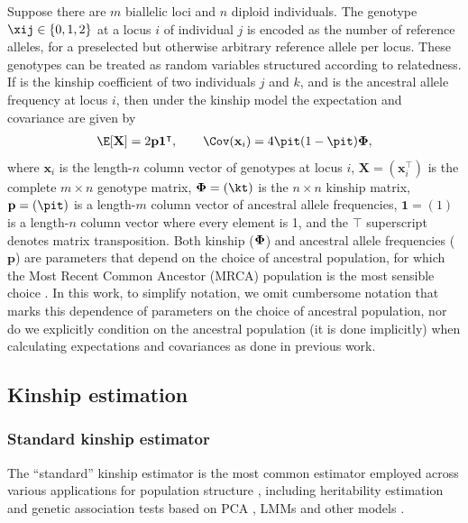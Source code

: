\documentclass[11pt]{article}
\newcommand{\kinMat}{%
  \ensuremath{%
    \mathbf{\Phi}
  }%
  \xspace%
}%
\begin{document}
Suppose there are $m$ biallelic loci and $n$ diploid individuals.
The genotype $\xij \in \{0,1,2\}$ at a locus $i$ of individual $j$ is encoded as the number of reference alleles, for a preselected but otherwise arbitrary reference allele per locus.
These genotypes can be treated as random variables structured according to relatedness.
If \kt is the kinship coefficient of two individuals $j$ and $k$, and \pit is the ancestral allele frequency at locus $i$, then under the kinship model \citep{ochoa_fst1,ochoa_estimating_2021} the expectation and covariance are given by
\begin{align*}
  \E[\mathbf{X}]
  =
    2 \mathbf{p} \mathbf{1}^\intercal
  ,
  \quad\quad
  \Cov(\mathbf{x}_i)
  =
    4 \pit (1-\pit) \kinMat
    ,
\end{align*}
where $\mathbf{x}_i$ is the length-$n$ column vector of genotypes at locus $i$, $\mathbf{X} = (\mathbf{x}_i^\intercal)$ is the complete $m \times n$ genotype matrix, $\kinMat = (\kt)$ is the $n \times n$ kinship matrix, $\mathbf{p} = (\pit)$ is a length-$m$ column vector of ancestral allele frequencies, $\mathbf{1} = (1)$ is a length-$n$ column vector where every element is 1, and the $\intercal$ superscript denotes matrix transposition.
Both kinship ($\kinMat$) and ancestral allele frequencies ($\mathbf{p}$) are parameters that depend on the choice of ancestral population, for which the Most Recent Common Ancestor (MRCA) population is the most sensible choice \citep{ochoa_fst1,ochoa_estimating_2021}.
In this work, to simplify notation, we omit cumbersome notation that marks this dependence of parameters on the choice of ancestral population, nor do we explicitly condition on the ancestral population (it is done implicitly) when calculating expectations and covariances as done in previous work.

\subsection{Kinship estimation}

\subsubsection{Standard kinship estimator}

The ``standard'' kinship estimator is the most common estimator employed across various applications for population structure \citep{astle_population_2009, yang_advantages_2014, speed_relatedness_2015, wang_efficient_2017}, including
heritability estimation \citep{speed_improved_2012, yang_advantages_2014, speed_relatedness_2015, speed_reevaluation_2017}
and genetic association tests based on PCA \citep{price_principal_2006},
LMMs \citep{astle_population_2009, zhou_genome-wide_2012, yang_advantages_2014, loh_efficient_2015, sul_population_2018}
and other models \citep{rakovski_kinship-based_2009, thornton_roadtrips:_2010}.
\end{document}
